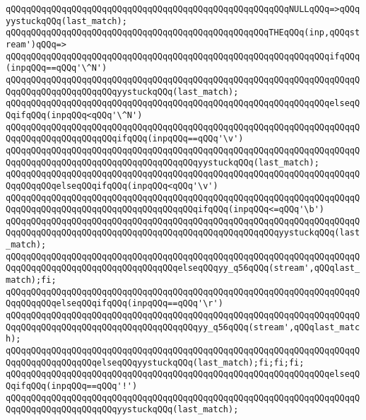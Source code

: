 \verb|qQQqqQQqqQQqqQQqqQQqqQQqqQQqqQQqqQQqqQQqqQQqqQQqqQQqqQQqNULLqQQq=>qQQqyystuckqQQq(last_match);|\newline
\verb|qQQqqQQqqQQqqQQqqQQqqQQqqQQqqQQqqQQqqQQqqQQqqQQqqQQqTHEqQQq(inp,qQQqstream')qQQq=>|\newline
\verb|qQQqqQQqqQQqqQQqqQQqqQQqqQQqqQQqqQQqqQQqqQQqqQQqqQQqqQQqqQQqqQQqifqQQq(inpqQQq==qQQq'\^N')|\newline
\verb|qQQqqQQqqQQqqQQqqQQqqQQqqQQqqQQqqQQqqQQqqQQqqQQqqQQqqQQqqQQqqQQqqQQqqQQqqQQqqQQqqQQqqQQqqQQqyystuckqQQq(last_match);|\newline
\verb|qQQqqQQqqQQqqQQqqQQqqQQqqQQqqQQqqQQqqQQqqQQqqQQqqQQqqQQqqQQqqQQqelseqQQqifqQQq(inpqQQq<qQQq'\^N')|\newline
\verb|qQQqqQQqqQQqqQQqqQQqqQQqqQQqqQQqqQQqqQQqqQQqqQQqqQQqqQQqqQQqqQQqqQQqqQQqqQQqqQQqqQQqqQQqqQQqifqQQq(inpqQQq==qQQq'\v')|\newline
\verb|qQQqqQQqqQQqqQQqqQQqqQQqqQQqqQQqqQQqqQQqqQQqqQQqqQQqqQQqqQQqqQQqqQQqqQQqqQQqqQQqqQQqqQQqqQQqqQQqqQQqqQQqqQQqyystuckqQQq(last_match);|\newline
\verb|qQQqqQQqqQQqqQQqqQQqqQQqqQQqqQQqqQQqqQQqqQQqqQQqqQQqqQQqqQQqqQQqqQQqqQQqqQQqqQQqelseqQQqifqQQq(inpqQQq<qQQq'\v')|\newline
\verb|qQQqqQQqqQQqqQQqqQQqqQQqqQQqqQQqqQQqqQQqqQQqqQQqqQQqqQQqqQQqqQQqqQQqqQQqqQQqqQQqqQQqqQQqqQQqqQQqqQQqqQQqqQQqifqQQq(inpqQQq<=qQQq'\b')|\newline
\verb|qQQqqQQqqQQqqQQqqQQqqQQqqQQqqQQqqQQqqQQqqQQqqQQqqQQqqQQqqQQqqQQqqQQqqQQqqQQqqQQqqQQqqQQqqQQqqQQqqQQqqQQqqQQqqQQqqQQqqQQqqQQqyystuckqQQq(last_match);|\newline
\verb|qQQqqQQqqQQqqQQqqQQqqQQqqQQqqQQqqQQqqQQqqQQqqQQqqQQqqQQqqQQqqQQqqQQqqQQqqQQqqQQqqQQqqQQqqQQqqQQqqQQqqQQqelseqQQqyy_q56qQQq(stream',qQQqlast_match);fi;|\newline
\verb|qQQqqQQqqQQqqQQqqQQqqQQqqQQqqQQqqQQqqQQqqQQqqQQqqQQqqQQqqQQqqQQqqQQqqQQqqQQqqQQqelseqQQqifqQQq(inpqQQq==qQQq'\r')|\newline
\verb|qQQqqQQqqQQqqQQqqQQqqQQqqQQqqQQqqQQqqQQqqQQqqQQqqQQqqQQqqQQqqQQqqQQqqQQqqQQqqQQqqQQqqQQqqQQqqQQqqQQqqQQqqQQqyy_q56qQQq(stream',qQQqlast_match);|\newline
\verb|qQQqqQQqqQQqqQQqqQQqqQQqqQQqqQQqqQQqqQQqqQQqqQQqqQQqqQQqqQQqqQQqqQQqqQQqqQQqqQQqqQQqqQQqelseqQQqyystuckqQQq(last_match);fi;fi;fi;|\newline
\verb|qQQqqQQqqQQqqQQqqQQqqQQqqQQqqQQqqQQqqQQqqQQqqQQqqQQqqQQqqQQqqQQqelseqQQqifqQQq(inpqQQq==qQQq'!')|\newline
\verb|qQQqqQQqqQQqqQQqqQQqqQQqqQQqqQQqqQQqqQQqqQQqqQQqqQQqqQQqqQQqqQQqqQQqqQQqqQQqqQQqqQQqqQQqqQQqyystuckqQQq(last_match);|\newline
